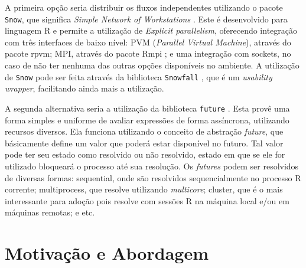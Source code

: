 A primeira opção seria distribuir os fluxos independentes utilizando o pacote 
\texttt{Snow}, que significa 
\emph{Simple Network of Workstations} \cite{ref:snow}. Este é desenvolvido para 
linguagem R e permite a utilização
de \emph{Explicit parallelism}, oferecendo integração com três interfaces de 
baixo nível: PVM (\emph{Parallel Virtual Machine}), através do pacote rpvm; 
MPI, 
através do pacote Rmpi \cite{ref:rmpi}; e uma integração com sockets, no caso 
de 
não ter nenhuma das outras 
opções disponíveis no ambiente. A utilização de \texttt{Snow} pode ser feita 
através da biblioteca \texttt{Snowfall} \cite{ref:snowfall},
que é um \emph{usability wrapper}, facilitando ainda mais a utilização.

A segunda alternativa seria a utilização da biblioteca \texttt{future} 
\cite{ref:future}. Esta provê uma forma simples e uniforme 
de avaliar expressões de forma assíncrona, utilizando recursos diversos. Ela 
funciona utilizando o conceito de abstração 
\emph{future}, que básicamente define um valor que poderá estar disponível no 
futuro. Tal valor pode ter seu estado como 
resolvido ou não resolvido, estado em que se ele for utilizado bloqueará o 
processo até sua resolução. Os \emph{futures} 
podem ser resolvidos de diversas formas: sequential, onde são resolvidos 
sequencialmente no processo R corrente; multiprocess,
que resolve utilizando \emph{multicore}; cluster, que é o mais interessante 
para 
adoção pois resolve com sessões R na máquina 
local e/ou em máquinas remotas; e etc.

\section{Motivação e Abordagem}\label{sect:motivation}
